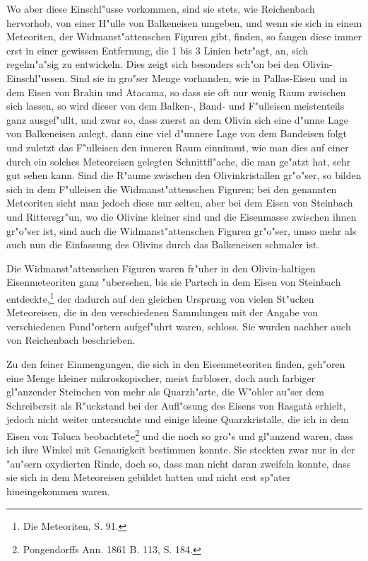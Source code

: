 \documentclass[a4paper, 11pt, oneside]{article}
\begin{document}
Wo aber diese Einschl"usse vorkommen, sind sie stets, wie Reichenbach hervorhob, von einer H"ulle von Balkeneisen umgeben, und wenn sie sich in einem Meteoriten, der Widmanst"attenschen Figuren gibt, finden, so fangen diese immer erst in einer gewissen Entfernung, die 1 bis 3 Linien betr"agt, an, sich regelm"a"sig zu entwickeln. Dies zeigt sich besonders sch"on bei den Olivin-Einschl"ussen. Sind sie in gro"ser Menge vorhanden, wie in Pallas-Eisen und in dem Eisen von Brahin und Atacama, so dass sie oft nur wenig Raum zwischen sich lassen, so wird dieser von dem Balken-, Band- und F"ulleisen meistenteils ganz ausgef"ullt, und zwar so, dass zuerst an dem Olivin sich eine d"unne Lage von Balkeneisen anlegt, dann eine viel d"unnere Lage von dem Bandeisen folgt und zuletzt das F"ulleisen den inneren Raum einnimmt, wie man dies auf einer durch ein solches Meteoreisen gelegten Schnittfl"ache, die man ge"atzt hat, sehr gut sehen kann. Sind die R"aume zwischen den Olivinkristallen gr"o"ser, so bilden sich in dem F"ulleisen die Widmanst"attenschen Figuren; bei den genannten Meteoriten sieht man jedoch diese nur selten, aber bei dem Eisen von Steinbach und Rittersgr"un, wo die Olivine kleiner sind und die Eisenmasse zwischen ihnen gr"o"ser ist, sind auch die Widmanst"attenschen Figuren gr"o"ser, umso mehr als auch nun die Einfassung des Olivins durch das Balkeneisen schmaler ist.

Die Widmanst"attenschen Figuren waren fr"uher in den Olivin-haltigen Eisenmeteoriten ganz "ubersehen, bis sie Partsch in dem Eisen von Steinbach entdeckte,\footnote{Die Meteoriten, S. 91.} der dadurch auf den gleichen Ursprung von vielen St"ucken Meteoreisen, die in den verschiedenen Sammlungen mit der Angabe von verschiedenen Fund"ortern aufgef"uhrt waren, schloss. Sie wurden nachher auch von Reichenbach beschrieben.

Zu den feiner Einmengungen, die sich in den Eisenmeteoriten finden, geh"oren eine Menge kleiner mikroskopischer, meist farbloser, doch auch farbiger gl"anzender Steinchen von mehr als Quarzh"arte, die W"ohler au"ser dem Schreibersit als R"uckstand bei der Aufl"osung des Eisens von Rasgatà erhielt, jedoch nicht weiter untersuchte und einige kleine Quarzkristalle, die ich in dem Eisen von Toluca beobachtete\footnote{Pongendorffs Ann. 1861 B. 113, S. 184.} und die noch so gro"s und gl"anzend waren, dass ich ihre Winkel mit Genauigkeit bestimmen konnte. Sie steckten zwar nur in der "au"sern oxydierten Rinde, doch so, dass man nicht daran zweifeln konnte, dass sie sich in dem Meteoreisen gebildet hatten und nicht erst sp"ater hineingekommen waren.
\end{document}
